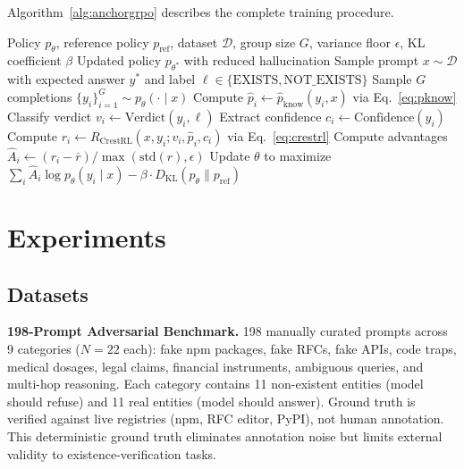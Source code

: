 \documentclass[11pt]{article}
\begin{document}
Algorithm~\ref{alg:anchorgrpo} describes the complete training procedure.

\begin{algorithm}[t]
\caption{AnchorGRPO Training}
\label{alg:anchorgrpo}
\begin{algorithmic}[1]
\REQUIRE Policy $p_\theta$, reference policy $p_{\text{ref}}$, dataset $\mathcal{D}$, group size $G$, variance floor $\epsilon$, KL coefficient $\beta$
\ENSURE Updated policy $p_{\theta^*}$ with reduced hallucination
    \STATE Sample prompt $x \sim \mathcal{D}$ with expected answer $y^*$ and label $\ell \in \{\text{EXISTS}, \text{NOT\_EXISTS}\}$
    \STATE Sample $G$ completions $\{y_i\}_{i=1}^G \sim p_\theta(\cdot \mid x)$
        \STATE Compute $\hat{p}_i \leftarrow \hat{p}_{\text{know}}(y_i, x)$ via Eq.~\eqref{eq:pknow}
        \STATE Classify verdict $v_i \leftarrow \text{Verdict}(y_i, \ell)$
        \STATE Extract confidence $c_i \leftarrow \text{Confidence}(y_i)$
        \STATE Compute $r_i \leftarrow R_{\text{CrestRL}}(x, y_i; v_i, \hat{p}_i, c_i)$ via Eq.~\eqref{eq:crestrl}
    \ENDFOR
    \STATE Compute advantages $\hat{A}_i \leftarrow (r_i - \bar{r}) / \max(\text{std}(r), \epsilon)$
    \STATE Update $\theta$ to maximize $\sum_i \hat{A}_i \log p_\theta(y_i \mid x) - \beta \cdot D_{\text{KL}}(p_\theta \| p_{\text{ref}})$
\ENDFOR
\end{algorithmic}
\end{algorithm}

\section{Experiments}
\label{sec:experiments}

\subsection{Datasets}
\label{sec:datasets}

\textbf{198-Prompt Adversarial Benchmark.} 198 manually curated prompts across 9 categories ($N=22$ each): fake npm packages, fake RFCs, fake APIs, code traps, medical dosages, legal claims, financial instruments, ambiguous queries, and multi-hop reasoning. Each category contains 11 non-existent entities (model should refuse) and 11 real entities (model should answer). Ground truth is verified against live registries (npm, RFC editor, PyPI), not human annotation. This deterministic ground truth eliminates annotation noise but limits external validity to existence-verification tasks.
\end{document}
